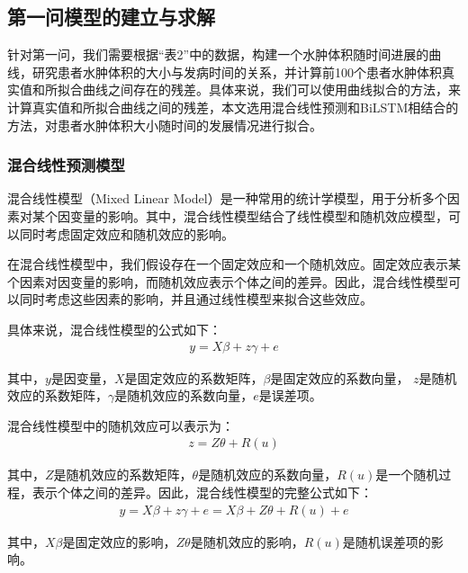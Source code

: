 \documentclass[bwprint]{gmcmthesis}
\begin{document}
\subsection{第一问模型的建立与求解}
针对第一问，我们需要根据“表2”中的数据，构建一个水肿体积随时间进展的曲线，研究患者水肿体积的大小与发病时间的关系，并计算前100个患者水肿体积真实值和所拟合曲线之间存在的残差。具体来说，我们可以使用曲线拟合的方法，来计算真实值和所拟合曲线之间的残差，本文选用混合线性预测和BiLSTM相结合的方法，对患者水肿体积大小随时间的发展情况进行拟合。
\subsubsection{混合线性预测模型}
混合线性模型（Mixed Linear Model）是一种常用的统计学模型\cite{zhang2010mixed}，用于分析多个因素对某个因变量的影响。其中，混合线性模型结合了线性模型和随机效应模型，可以同时考虑固定效应和随机效应的影响。

在混合线性模型中，我们假设存在一个固定效应和一个随机效应。固定效应表示某个因素对因变量的影响，而随机效应表示个体之间的差异。因此，混合线性模型可以同时考虑这些因素的影响，并且通过线性模型来拟合这些效应。

具体来说，混合线性模型的公式如下：
\begin{equation}
\begin{aligned}
y=X \beta+z \gamma+e
\end{aligned}
\label{equ:12}
\end{equation}

其中，$y$是因变量，$X$是固定效应的系数矩阵，$\beta$是固定效应的系数向量，
$z$是随机效应的系数矩阵，$\gamma$是随机效应的系数向量，$e$是误差项。

混合线性模型中的随机效应可以表示为：
\begin{equation}
\begin{aligned}
z=Z \theta+R(u)
\end{aligned}
\label{equ:13}
\end{equation}

其中，$Z$是随机效应的系数矩阵，$\theta$是随机效应的系数向量，$R(u)$是一个随机过程，表示个体之间的差异。因此，混合线性模型的完整公式如下：
\begin{equation}
\begin{aligned}
y=X \beta+z \gamma+e=X \beta+Z \theta+R(u)+e
\end{aligned}
\label{equ:14}
\end{equation}

其中，$X \beta$是固定效应的影响，$Z \theta$是随机效应的影响，$R(u)$是随机误差项的影响。
\end{document}
